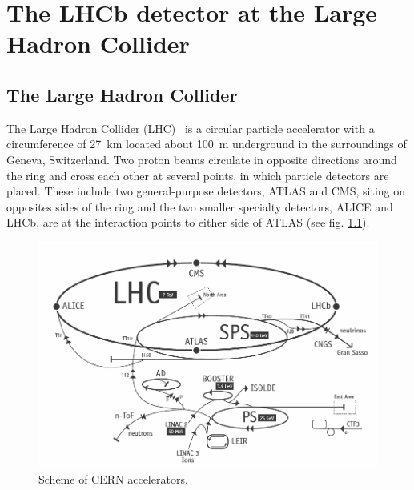 \chapter{The LHCb detector at the Large Hadron Collider}
\label{sec:Detector}

\section{The Large Hadron Collider}

The Large Hadron Collider (LHC)~\cite{Evans:2009zzc} is a circular particle accelerator with a circumference of 27~km located about 100~m underground
in the surroundings of Geneva, Switzerland. Two proton beams circulate in opposite directions around the ring and cross each
other at several points, in which particle detectors are placed. These include two general-purpose detectors, ATLAS and CMS,
siting on opposites sides of the ring and the two smaller specialty detectors, ALICE and LHCb, are at the interaction points
to either side of ATLAS (see fig. \ref{lhc}).

\begin{figure}[h!]
\centering
\includegraphics[width=1\textwidth]{Detector/figs/LHC_scheme.png}
\caption{Scheme of CERN accelerators.} \label{lhc}
\end{figure}

